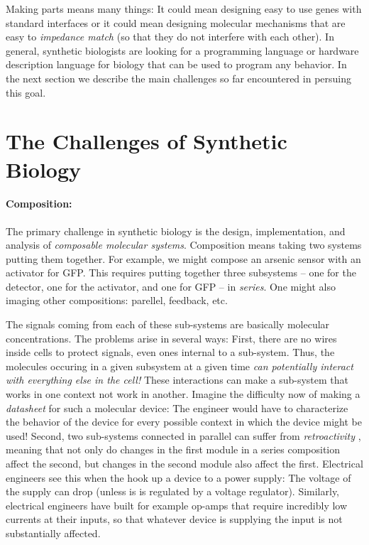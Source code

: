 Making parts means many things: It could mean designing easy to use
genes with standard interfaces \cite{biobricks} or it could mean
designing molecular mechanisms that are easy to {\em impedance match}
\cite{retroactivity} (so that they do not interfere with each
other). In general, synthetic biologists are looking for a programming
language or hardware description language for biology that can be used
to program any behavior. In the next section we describe the main
challenges so far encountered in persuing this goal.


\section{The Challenges of Synthetic Biology}


\paragraph{Composition:} The primary challenge in synthetic biology is
the design, implementation, and analysis of {\em composable molecular
  systems}. Composition means taking two systems putting them
together. For example, we might compose an arsenic sensor with an
activator for GFP. This requires putting together three subsystems --
one for the detector, one for the activator, and one for GFP -- in
{\em series}. One might also imaging other compositions: parellel,
feedback, etc.

The signals coming from each of these sub-systems are basically
molecular concentrations. The problems arise in several ways: First,
there are no wires inside cells to protect signals, even ones internal
to a sub-system. Thus, the molecules occuring in a given subsystem at
a given time {\em can potentially interact with everything else in the
  cell!} These interactions can make a sub-system that works in one
context not work in another. Imagine the difficulty now of making a
{\em datasheet} for such a molecular device: The engineer would have
to characterize the behavior of the device for every possible context
in which the device might be used! Second, two sub-systems connected
in parallel can suffer from {\em retroactivity} \cite{retroactivity},
meaning that not only do changes in the first module in a series
composition affect the second, but changes in the second module also
affect the first. Electrical engineers see this when the hook up a
device to a power supply: The voltage of the supply can drop (unless
is is regulated by a voltage regulator). Similarly, electrical
engineers have built for example op-amps that require incredibly low
currents at their inputs, so that whatever device is supplying the
input is not substantially affected.

